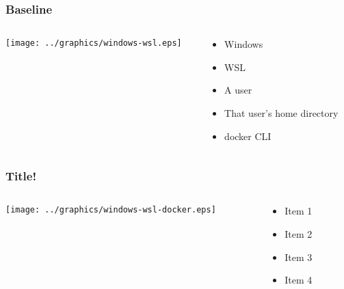     \begin{frame}
      \frametitle{Baseline}
      \begin{columns}
        \begin{column}{0.5\textwidth}
          \texttt{[image: ../graphics/windows-wsl.eps]}
        \end{column}
        \begin{column}{0.5\textwidth}
          \begin{itemize}
          \item Windows\pause
          \item WSL\pause
          \item A user\pause
          \item That user's home directory\pause
          \item docker CLI
          \end{itemize}
        \end{column}
      \end{columns}
    \end{frame}

    \begin{frame}
      \frametitle{Title!}
      \begin{columns}
        \begin{column}{0.5\textwidth}
          \texttt{[image: ../graphics/windows-wsl-docker.eps]}
        \end{column}
        \begin{column}{0.5\textwidth}
          \begin{itemize}
          \item Item 1
          \item Item 2
          \item Item 3
          \item Item 4
          \end{itemize}
        \end{column}
      \end{columns}
    \end{frame}

